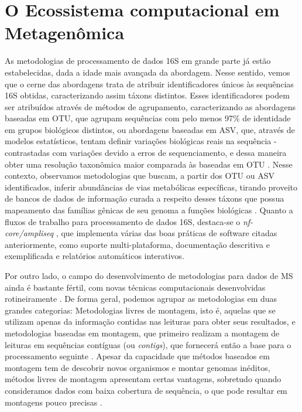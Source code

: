 \documentclass[
	12pt,				%
	oneside,			%
	a4paper,			%
	chapter=TITLE,		%
	section=TITLE,		%
	english,			%
	brazil				%
	]{abntex2}
\begin{document}
\section{O Ecossistema computacional em Metagenômica}\label{o-ecossistema-computacional-em-metagenuxf4mica}

As metodologias de processamento de dados \gls{16S} em grande parte já estão estabelecidas, dada a idade mais avançada da abordagem. Nesse sentido, vemos que o cerne das abordagens trata de atribuir identificadores únicos às sequências 16S obtidas, caracterizando assim táxons distintos. Esses identificadores podem ser atribuídos através de métodos de agrupamento, caracterizando as abordagens baseadas em \gls{OTU}, que agrupam sequências com pelo menos 97\% de identidade em grupos biológicos distintos, ou abordagens baseadas em \gls{ASV}, que, através de modelos estatísticos, tentam definir variações biológicas reais na sequência - contrastadas com variações devido a erros de sequenciamento, e dessa maneira obter uma resolução taxonômica maior comparada às baseadas em \gls{OTU} \autocite{chiarello2022}. Nesse contexto, observamos metodologias que buscam, a partir dos \gls{OTU} ou \gls{ASV} identificados, inferir abundâncias de vias metabólicas específicas, tirando proveito de bancos de dados de informação curada a respeito desses táxons que possua mapeamento das famílias gênicas de seu genoma a funções biológicas \autocite{douglas2020}. Quanto a fluxos de trabalho para processamento de dados \gls{16S}, destaca-se o \emph{nf-core/ampliseq} \autocite{straub2020}, que implementa várias das boas práticas de software citadas anteriormente, como suporte multi-plataforma, documentação descritiva e exemplificada e relatórios automáticos interativos.

Por outro lado, o campo do desenvolvimento de metodologias para dados de \gls{MS} ainda é bastante fértil, com novas técnicas computacionais desenvolvidas rotineiramente \autocite{liu2021}. De forma geral, podemos agrupar as metodologias em duas grandes categorias: Metodologias livres de montagem, isto é, aquelas que se utilizam apenas da informação contidas nas leituras para obter seus resultados, e metodologias baseadas em montagem, que primeiro realizam a montagem de leituras em sequências contíguas (ou \textit{contigs}), que fornecerá então a base para o processamento seguinte \autocite{breitwieser2019}. Apesar da capacidade que métodos baseados em montagem tem de descobrir novos organismos e montar genomas inéditos, métodos livres de montagem apresentam certas vantagens, sobretudo quando consideramos dados com baixa cobertura de sequência, o que pode resultar em montagens pouco precisas \autocite{ayling2020}.
\end{document}
